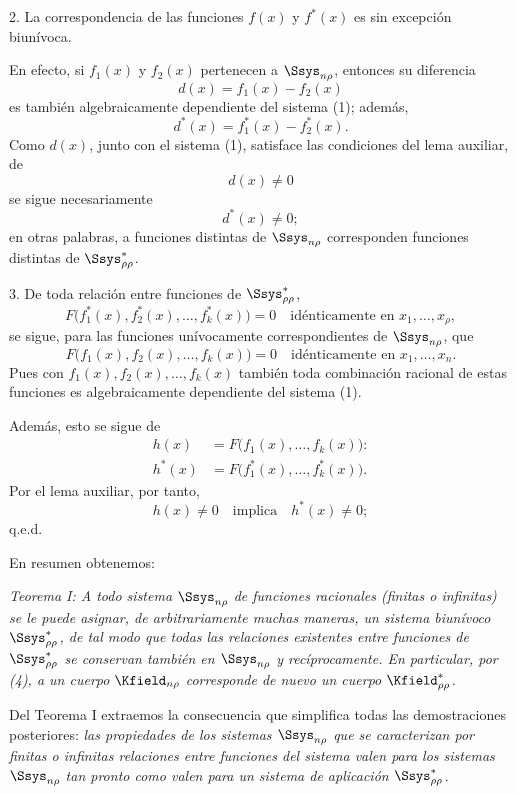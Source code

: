 \documentclass[11pt]{article}
\begin{document}
2. La correspondencia de las funciones $f(x)$ y $f^*(x)$ es sin excepción biunívoca.

En efecto, si $f_1(x)$ y $f_2(x)$ pertenecen a $\Ssys_{n\rho}$, entonces su diferencia
\[
  d(x)=f_1(x)-f_2(x)
\]
es también algebraicamente dependiente del sistema (1); además,
\[
  d^*(x)=f_1^*(x)-f_2^*(x).
\]
Como $d(x)$, junto con el sistema (1), satisface las condiciones del lema auxiliar, de
\[
  d(x)\ne0
\]
se sigue necesariamente
\[
  d^*(x)\ne0;
\]
en otras palabras, a funciones distintas de $\Ssys_{n\rho}$ corresponden funciones distintas de $\Ssys^*_{\rho\rho}$.

3. De toda relación entre funciones de $\Ssys^*_{\rho\rho}$,
\[
  F\bigl(f_1^*(x),f_2^*(x),\ldots,f_k^*(x)\bigr)=0
  \quad\text{idénticamente en }x_1,\ldots,x_\rho,
\]
se sigue, para las funciones unívocamente correspondientes de $\Ssys_{n\rho}$, que
\[
  F\bigl(f_1(x),f_2(x),\ldots,f_k(x)\bigr)=0
  \quad\text{idénticamente en }x_1,\ldots,x_n.
\]
Pues con $f_1(x),f_2(x),\ldots,f_k(x)$ también toda combinación racional de estas funciones es algebraicamente dependiente del sistema (1).

Además, esto se sigue de
\begin{equation}
\begin{aligned}
 h(x)&=F\bigl(f_1(x),\ldots,f_k(x)\bigr):\\
 h^*(x)&=F\bigl(f_1^*(x),\ldots,f_k^*(x)\bigr).
\end{aligned}
\tag{4}
\end{equation}
Por el lema auxiliar, por tanto,
\[
  h(x)\ne0\quad\text{implica}\quad h^*(x)\ne0;
\]
q.e.d.

En resumen obtenemos:

\emph{Teorema I: A todo sistema $\Ssys_{n\rho}$ de funciones racionales (finitas o infinitas) se le puede asignar, de arbitrariamente muchas maneras, un sistema biunívoco $\Ssys^*_{\rho\rho}$, de tal modo que todas las relaciones existentes entre funciones de $\Ssys^*_{\rho\rho}$ se conservan también en $\Ssys_{n\rho}$ y recíprocamente. En particular, por (4), a un cuerpo $\Kfield_{n\rho}$ corresponde de nuevo un cuerpo $\Kfield^*_{\rho\rho}$.}

Del Teorema I extraemos la consecuencia que simplifica todas las demostraciones posteriores: \emph{las propiedades de los sistemas $\Ssys_{n\rho}$ que se caracterizan por finitas o infinitas relaciones entre funciones del sistema valen para los sistemas $\Ssys_{n\rho}$ tan pronto como valen para un sistema de aplicación $\Ssys^*_{\rho\rho}$.}
\end{document}
